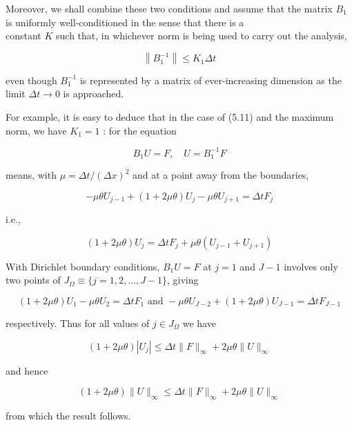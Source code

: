 \documentclass[10pt]{article}
\begin{document}
Moreover, we shall combine these two conditions and assume that the matrix \(B_{1}\) is uniformly well-conditioned in the sense that there is a\\
constant \(K\) such that, in whichever norm is being used to carry out the analysis,

\[
\left\|B_{1}^{-1}\right\| \leq K_{1} \Delta t
\]

even though \(B_{1}^{-1}\) is represented by a matrix of ever-increasing dimension as the limit \(\Delta t \rightarrow 0\) is approached.

For example, it is easy to deduce that in the case of (5.11) and the maximum norm, we have \(K_{1}=1\) : for the equation

\[
B_{1} U=F, \quad U=B_{1}^{-1} F
\]

means, with \(\mu=\Delta t /(\Delta x)^{2}\) and at a point away from the boundaries,

\[
-\mu \theta U_{j-1}+(1+2 \mu \theta) U_{j}-\mu \theta U_{j+1}=\Delta t F_{j}
\]

i.e.,

\[
(1+2 \mu \theta) U_{j}=\Delta t F_{j}+\mu \theta\left(U_{j-1}+U_{j+1}\right)
\]

With Dirichlet boundary conditions, \(B_{1} U=F\) at \(j=1\) and \(J-1\) involves only two points of \(J_{\Omega} \equiv\{j=1,2, \ldots, J-1\}\), giving

\[
(1+2 \mu \theta) U_{1}-\mu \theta U_{2}=\Delta t F_{1} \text { and }-\mu \theta U_{J-2}+(1+2 \mu \theta) U_{J-1}=\Delta t F_{J-1}
\]

respectively. Thus for all values of \(j \in J_{\Omega}\) we have

\[
(1+2 \mu \theta)\left|U_{j}\right| \leq \Delta t\|F\|_{\infty}+2 \mu \theta\|U\|_{\infty}
\]

and hence

\[
(1+2 \mu \theta)\|U\|_{\infty} \leq \Delta t\|F\|_{\infty}+2 \mu \theta\|U\|_{\infty}
\]

from which the result follows.
\end{document}
